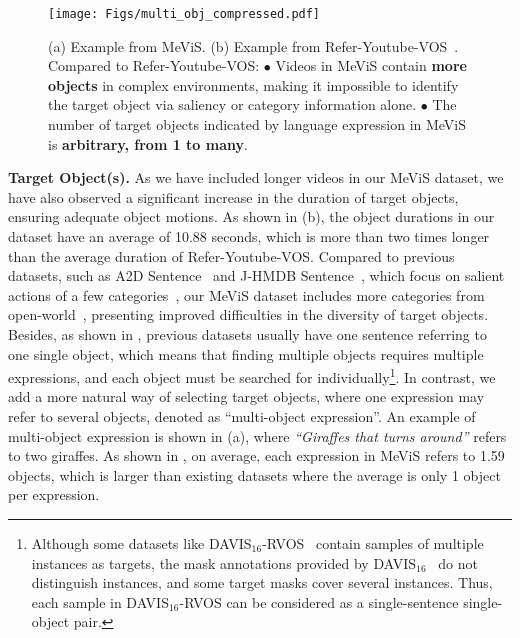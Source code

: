 \documentclass[10pt,twocolumn,letterpaper]{article}
\newcommand{\ourdataset}{MeViS\xspace}
\begin{document}
\begin{figure}
    \centering
    \texttt{[image: Figs/multi\_obj\_compressed.pdf]}
    \vspace{-7.6mm}
    \caption{(a) Example from \ourdataset. (b) Example from Refer-Youtube-VOS~\cite{seo2020urvos}. Compared to Refer-Youtube-VOS: $\bullet$ Videos in \ourdataset contain \textbf{more objects} in complex environments, making it impossible to identify the target object via saliency or category information alone. $\bullet$ The number of target objects indicated by language expression in \ourdataset is \textbf{arbitrary, from 1 to many}.}
    \label{fig:VideoContent}
    \vspace{-3mm}
\end{figure}

\vspace{1mm}
\noindent\textbf{Target Object(s).} As we have included longer videos in our \ourdataset dataset, we have also observed a significant increase in the duration of target objects, ensuring adequate object motions. As shown in (b), the object durations in our dataset have an average of 10.88 seconds, which is more than two times longer than the average duration of Refer-Youtube-VOS. Compared to previous datasets, such as A2D Sentence~\cite{gavrilyuk2018actor} and J-HMDB Sentence~\cite{gavrilyuk2018actor}, which focus on salient actions of a few categories~\cite{seo2020urvos}, our \ourdataset dataset includes more categories from open-world~\cite{UVO,OVIS,MOSE,TAOVOS}, presenting improved difficulties in the diversity of target objects. Besides, as shown in , previous datasets usually have one sentence referring to one single object, which means that finding multiple objects requires multiple expressions, and each object must be searched for individually\footnote{Although some datasets like DAVIS$_{16}$-RVOS~\cite{khoreva2018video} contain samples of multiple instances as targets, the mask annotations provided by DAVIS$_{16}$~\cite{davis2016} do not distinguish instances, and some target masks cover several instances. Thus, each sample in DAVIS$_{16}$-RVOS can be considered as a single-sentence single-object pair.}. In contrast, we add a more natural way of selecting target objects, where one expression may refer to several objects, denoted as ``multi-object expression''. An example of multi-object expression is shown in (a), where \textit{``Giraffes that turns around''} refers to two giraffes. As shown in , on average, each expression in \ourdataset refers to 1.59 objects, which is larger than existing datasets where the average is only 1 object per expression.
\end{document}
